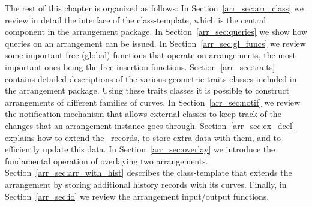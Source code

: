 The rest of this chapter is organized as follows: In
Section~\ref{arr_sec:arr_class} we review in detail the interface
of the  class-template, which is the central
component in the arrangement package. In
Section~\ref{arr_sec:queries} we show how queries on an arrangement
can be issued. In Section~\ref{arr_sec:gl_funcs} we
review some important free (global) functions that operate on
arrangements, the most important ones being the free 
insertion-functions. Section~\ref{arr_sec:traits} contains detailed
descriptions of the various geometric traits classes included in
the arrangement package. Using these traits classes it is possible
to construct arrangements of different families of curves. In
Section~\ref{arr_sec:notif} we review the notification mechanism
that allows external classes to keep track of the changes that an
arrangement instance goes through. Section~\ref{arr_sec:ex_dcel}
explains how to extend the \dcel\ records, to store extra data
with them, and to efficiently update this data.
In Section~\ref{arr_sec:overlay} we introduce the fundamental
operation of overlaying two arrangements.
Section~\ref{arr_sec:arr_with_hist} describes the
 class-template that extends the
arrangement by storing additional history records with its curves.
Finally, in Section~\ref{arr_sec:io} we review the arrangement
input/output functions.
